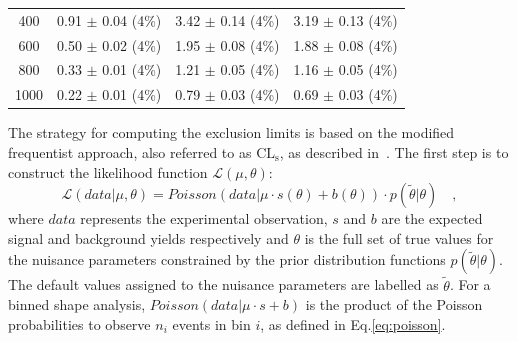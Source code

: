\begin{table}[htb]
\begin{center}
{\begin{tabular}{c c c c }
 400                        &       0.91 $\pm$       0.04 (4\%)             &       3.42 $\pm$       0.14 (4\%)     &       3.19 $\pm$       0.13 (4\%)      \\
 600                        &       0.50 $\pm$       0.02 (4\%)             &       1.95 $\pm$       0.08 (4\%)     &       1.88 $\pm$       0.08 (4\%)      \\
 800                        &       0.33 $\pm$       0.01 (4\%)             &       1.21 $\pm$       0.05 (4\%)     &       1.16 $\pm$       0.05 (4\%)      \\
 1000                       &       0.22 $\pm$       0.01 (4\%)             &       0.79 $\pm$       0.03 (4\%)     &       0.69 $\pm$       0.03 (4\%)      \\
\bottomrule
\end{tabular}
}
\end{center}
\end{table}

The strategy for computing the exclusion limits is based on the modified frequentist approach, also referred to as $\mathrm{CL_s}$, as described in~\cite{CMS-NOTE-2011-005}. The first step is to construct the likelihood function $\mathcal{L}(\mu,\theta)$:
\begin{equation}
\mathcal{L}(data|\mu,\theta) = Poisson(data|\mu\cdot s(\theta) + b(\theta))\cdot p(\tilde{\theta}|\theta) \quad,
\end{equation}
where $data$ represents the experimental observation, $s$ and $b$ are the expected signal and background yields respectively and $\theta$ is the full set of true values for the nuisance parameters constrained by the prior distribution functions $p(\tilde{\theta}|\theta)$. The default values assigned to the nuisance parameters are labelled as $\tilde{\theta}$. 
For a binned shape analysis, $Poisson(data|\mu\cdot s + b)$ is the product of the Poisson probabilities to observe $n_i$ events in bin $i$, as defined in Eq.\eqref{eq:poisson}.

